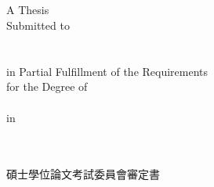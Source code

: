 \begin{center}
\makebox[5cm][l]{\large{\advisorEnameC}}\\ %
\fi
%
\renewcommand{\baselinestretch}{\mybaselinestretch}   %
\large %
%
\vfill
\makebox[4cm][s]{\large{\univCname}}\\%
\makebox[6cm][s]{\large{\deptCname}}\\%
\\%
%
\vfill
\large{A Thesis}\\%
\large{Submitted to }%
%
\large{\fulldeptEname}\\%
%
%
\ifx \collEname  \itsempty
\relax %
\else
\large{\collEname}\\%
\fi
%
\large{\univEname}\\%
%
\large{in Partial Fulfillment of the Requirements}\\
%
\large{for the Degree of}\\
%
\large{\degreeEname}\\%
%
\large{in}\\
%
\large{\deptEname}\\%
%
\large{\eMonth\ \eYear}\\%
%
\large{\ePlace}%
\vfill
{}
\end{center}
\normalsize
\clearpage
%
\newpage%
\thispagestyle{EmptyWaterMarkPage}  %
%

\begin{center}
\fontsize{24}{36}\selectfont 碩士學位論文考試委員會審定書\\
\vspace{0.5cm}
\end{center}

